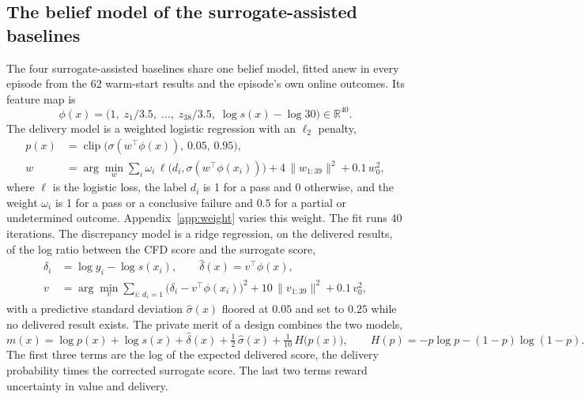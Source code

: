 \subsection{The belief model of the surrogate-assisted baselines}

The four surrogate-assisted baselines share one belief model, fitted anew in
every episode from the 62 warm-start results and the episode's own online
outcomes. Its feature map is
\begin{equation}
\phi(x) = \bigl( 1,\; z_1/3.5,\; \dots,\; z_{38}/3.5,\; \log s(x) - \log 30
\bigr) \in \mathbb{R}^{40}.
\label{eq:features}
\end{equation}
The delivery model is a weighted logistic regression with an $\ell_2$ penalty,
\begin{equation}
\begin{aligned}
p(x) &= \operatorname{clip}\bigl( \sigma(w^{\top} \phi(x)),\, 0.05,\, 0.95 \bigr), \\
w &= \arg\min_{w} \sum_{i} \omega_i\, \ell\bigl( d_i, \sigma(w^{\top} \phi(x_i)) \bigr)
+ 4\, \| w_{1:39} \|^{2} + 0.1\, w_0^{2},
\end{aligned}
\label{eq:delivery-model}
\end{equation}
where $\ell$ is the logistic loss, the label $d_i$ is 1 for a pass and 0
otherwise, and the weight $\omega_i$ is 1 for a pass or a conclusive failure
and $0.5$ for a partial or undetermined outcome. Appendix~\ref{app:weight}
varies this weight. The fit runs 40 iterations. The discrepancy model is a
ridge regression, on the delivered results, of the log ratio between the CFD
score and the surrogate score,
\begin{equation}
\begin{aligned}
\delta_i &= \log y_i - \log s(x_i), \qquad \hat{\delta}(x) = v^{\top} \phi(x), \\
v &= \arg\min_{v} \sum_{i:\, d_i = 1} \bigl( \delta_i - v^{\top} \phi(x_i) \bigr)^{2}
+ 10\, \| v_{1:39} \|^{2} + 0.1\, v_0^{2},
\end{aligned}
\label{eq:discrepancy-model}
\end{equation}
with a predictive standard deviation $\hat{\sigma}(x)$ floored at $0.05$ and
set to $0.25$ while no delivered result exists. The private merit of a design
combines the two models,
\begin{equation}
m(x) = \log p(x) + \log s(x) + \hat{\delta}(x) + \tfrac{1}{2}\, \hat{\sigma}(x)
+ \tfrac{1}{10}\, H\bigl( p(x) \bigr),
\qquad
H(p) = -p \log p - (1 - p) \log (1 - p).
\label{eq:merit}
\end{equation}
The first three terms are the log of the expected delivered score, the
delivery probability times the corrected surrogate score. The last two terms
reward uncertainty in value and delivery.

